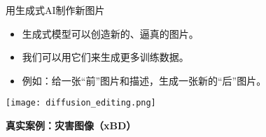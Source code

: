 
\begin{refsection}
\begin{frame}{用生成式AI制作新图片}
  \begin{itemize}
    \item 生成式模型可以创造新的、逼真的图片。
    \item 我们可以用它们来生成更多训练数据。
    \item 例如：给一张“前”图片和描述，生成一张新的“后”图片。
  \end{itemize}
  \centering
  \texttt{[image: diffusion\_editing.png]}
\end{frame}
\end{refsection}

\begin{frame}
  \centering
  \vspace{2.5cm}
  {\LARGE \textbf{真实案例：灾害图像（xBD）}}
\end{frame}

